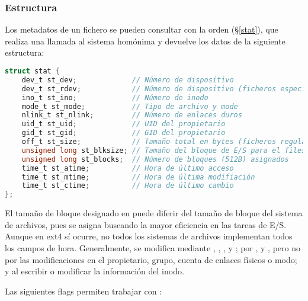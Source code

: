 \subsubsection{Estructura }

Los metadatos de un fichero se pueden consultar con la orden  (\S\ref{stat}), que realiza una llamada al sistema homónima y devuelve los datos de la siguiente estructura:

\begin{lstlisting}[language=C]
struct stat {
	dev_t st_dev;             // Número de dispositivo
	dev_t st_rdev;            // Número de dispositivo (ficheros especiales)
	ino_t st_ino;             // Número de inodo
	mode_t st_mode;           // Tipo de archivo y mode
	nlink_t st_nlink;         // Número de enlaces duros
	uid_t st_uid;             // UID del propietario
	gid_t st_gid;             // GID del propietario
	off_t st_size;            // Tamaño total en bytes (ficheros regulares)
	unsigned long st_blksize; // Tamaño del bloque de E/S para el filesystem
	unsigned long st_blocks;  // Número de bloques (512B) asignados
	time_t st_atime;          // Hora de último acceso
	time_t st_mtime;          // Hora de última modifiación
	time_t st_ctime;          // Hora de último cambio
};
\end{lstlisting}

El tamaño de bloque designado en  puede diferir del tamaño de bloque del sistema de archivos, pues se asigna buscando la mayor eficiencia en las tareas de E/S.
Aunque en ext4 sí ocurre, no todos los sistemas de archivos implementan todos los campos de hora.
Generalmente,  se modifica mediante , , ,  y ;  por ,  y , pero no por las modificaciones en el propietario, grupo, cuenta de enlaces físicos o modo; y  al escribir o modificar la información  del inodo.

Las siguientes flags permiten trabajar con :

